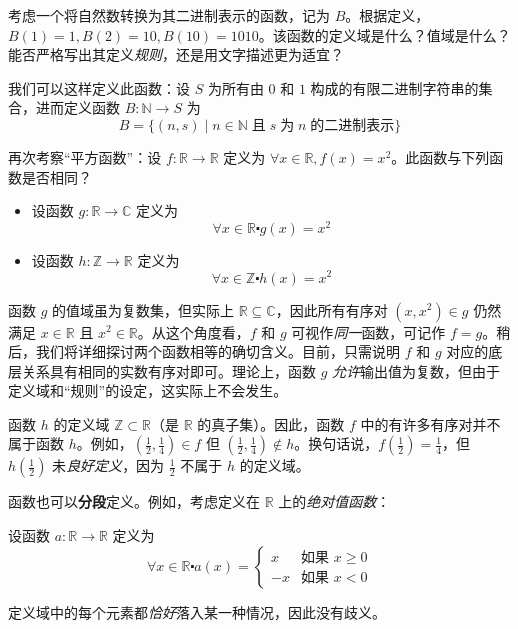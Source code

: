 \begin{example}
    考虑一个将自然数转换为其二进制表示的函数，记为 $B$。根据定义，$B(1) = 1, B(2) = 10, B(10) = 1010$。该函数的定义域是什么？值域是什么？能否严格写出其定义\emph{规则}，还是用文字描述更为适宜？

    我们可以这样定义此函数：设 $S$ 为所有由 $0$ 和 $1$ 构成的有限二进制字符串的集合，进而定义函数 $B : \mathbb{N} \to S$ 为
    \[B = \{(n, s) \mid n \in \mathbb{N} \;\text{且}\; s \;\text{为}\; n \;\text{的二进制表示}\}\]
\end{example}

\begin{example}
    再次考察``平方函数''：设 $f : \mathbb{R} \to \mathbb{R}$ 定义为 $\forall x \in \mathbb{R}, f(x) = x^2$。此函数与下列函数是否相同？
    \begin{itemize}
        \item 设函数 $g : \mathbb{R} \to \mathbb{C}$ 定义为
            \[\forall x \in \mathbb{R} \centerdot g(x) = x^2\]
        \item 设函数 $h : \mathbb{Z} \to \mathbb{R}$ 定义为
            \[\forall x \in \mathbb{Z} \centerdot h(x) = x^2\]
    \end{itemize}

    函数 $g$ 的值域虽为复数集，但实际上 $\mathbb{R} \subseteq \mathbb{C}$，因此所有有序对 $(x, x^2) \in g$ 仍然满足 $x \in \mathbb{R}$ 且 $x^2 \in \mathbb{R}$。从这个角度看，$f$ 和 $g$ 可视作\emph{同一}函数，可记作 $f = g$。稍后，我们将详细探讨两个函数相等的确切含义。目前，只需说明 $f$ 和 $g$ 对应的底层关系具有相同的实数有序对即可。理论上，函数 $g$ \emph{允许}输出值为复数，但由于定义域和``规则''的设定，这实际上不会发生。

    函数 $h$ 的定义域 $\mathbb{Z} \subset \mathbb{R}$（是 $\mathbb{R}$ 的真子集）。因此，函数 $f$ 中的有许多有序对并不属于函数 $h$。例如，$(\frac{1}{2}, \frac{1}{4}) \in f$ 但 $(\frac{1}{2}, \frac{1}{4}) \notin h$。换句话说，$f(\frac{1}{2}) = \frac{1}{4}$，但 $h(\frac{1}{2})$ 未\emph{良好定义}，因为 $\frac{1}{2}$ 不属于 $h$ 的定义域。
\end{example}

\begin{example}
    函数也可以\textbf{分段}定义。例如，考虑定义在 $\mathbb{R}$ 上的\emph{绝对值函数}：

    设函数 $a : \mathbb{R} \to \mathbb{R}$ 定义为
    \[\forall x \in \mathbb{R} \centerdot a(x) = 
    \begin{cases}
         x &\text{如果\ } x \ge 0 \\
        -x &\text{如果\ } x < 0
    \end{cases}\]

    定义域中的每个元素都\emph{恰好}落入某一种情况，因此没有歧义。
\end{example}

